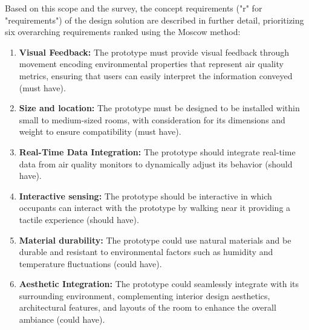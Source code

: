 Based on this scope and the survey, the concept requirements ("r" for "requirements") of the design solution are described in further detail, prioritizing six overarching requirements ranked using the Moscow method:

\begin{enumerate}
    \renewcommand{\labelenumi}{R\arabic{enumi}:}
    \item \textbf{Visual Feedback:} The prototype must provide visual feedback through movement encoding environmental properties that represent air quality metrics, ensuring that users can easily interpret the information conveyed (must have).
    \item \textbf{Size and location:} The prototype must be designed to be installed within small to medium-sized rooms, with consideration for its dimensions and weight to ensure compatibility (must have).
    \item \textbf{Real-Time Data Integration:} The prototype should integrate real-time data from air quality monitors to dynamically adjust its behavior (should have).
    \item \textbf{Interactive sensing:} The prototype should be interactive in which occupants can interact with the prototype by walking near it providing a tactile experience (should have).
    \item \textbf{Material durability:} The prototype could use natural materials and be durable and resistant to environmental factors such as humidity and temperature fluctuations (could have).
    \item \textbf{Aesthetic Integration:} The prototype could seamlessly integrate with its surrounding environment, complementing interior design aesthetics, architectural features, and layouts of the room to enhance the overall ambiance (could have).
\end{enumerate}

